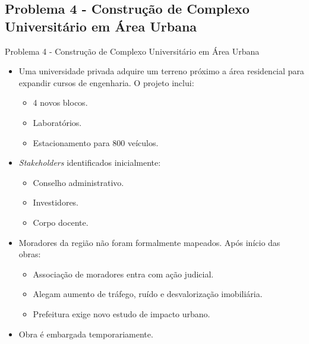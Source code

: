 \documentclass{beamer}
\begin{document}
\subsection{Problema 4 - Construção de Complexo Universitário em Área Urbana}

\begin{frame}{Problema 4 - Construção de Complexo Universitário em Área Urbana}
	\begin{itemize}
		\justifying
		\item Uma universidade privada adquire um terreno próximo a área residencial para expandir cursos de engenharia. O projeto inclui:
			\begin{itemize}
				\item 4 novos blocos.
				\item Laboratórios.
				\item Estacionamento para 800 veículos.
			\end{itemize}
		\item \textit{Stakeholders} identificados inicialmente:
			\begin{itemize}
				\item Conselho administrativo.
				\item Investidores.
				\item Corpo docente.
			\end{itemize}
		\item Moradores da região não foram formalmente mapeados. Após início das obras:
			\begin{itemize}
				\justifying
				\item Associação de moradores entra com ação judicial.
				\item Alegam aumento de tráfego, ruído e desvalorização imobiliária.
				\item Prefeitura exige novo estudo de impacto urbano.
			\end{itemize}
		\item Obra é embargada temporariamente.
	\end{itemize}
\end{frame}
\end{document}
